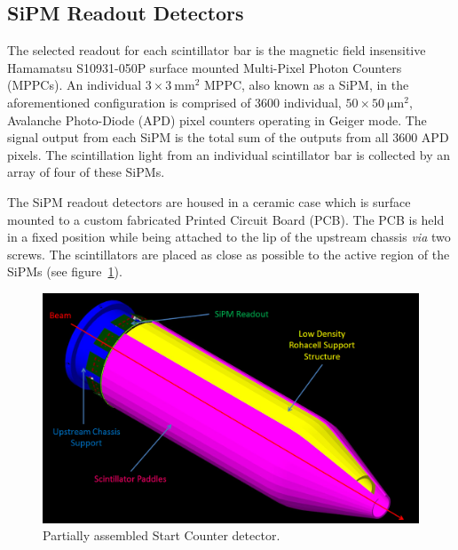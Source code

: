 \subsection{SiPM Readout Detectors}

The selected readout for each scintillator bar is the magnetic field insensitive Hamamatsu S10931-050P surface mounted Multi-Pixel Photon Counters (MPPCs).  An individual $\mathrm{3 \times 3\ mm^2}$ MPPC, also known as a SiPM, in the aforementioned configuration is comprised of 3600 individual, $\mathrm{50 \times 50\ \mu m^2}$, Avalanche Photo-Diode (APD) pixel counters operating in Geiger mode. The signal output from each SiPM is the total sum of the outputs from all 3600 APD pixels.  The scintillation light from an individual scintillator bar is collected by an array of four of these SiPMs.

The SiPM readout detectors are housed in a ceramic case which is surface mounted to a custom fabricated Printed Circuit Board (PCB).  The PCB is held in a fixed position while being attached to the lip of the upstream chassis \emph{via} two screws.  The scintillators are placed as close as possible to the active region of the SiPMs (see figure~\ref{fig:Partially Assembled Start Counter}).
\begin{figure}[!htb]
	\centering
	\includegraphics[width=1.0\columnwidth]{design/figs/Labeled_Partially_Assembled_Detector}
	\caption[Partially assembled Start Counter detector]{Partially assembled Start Counter detector.}
	\label{fig:Partially Assembled Start Counter}
\end{figure}


